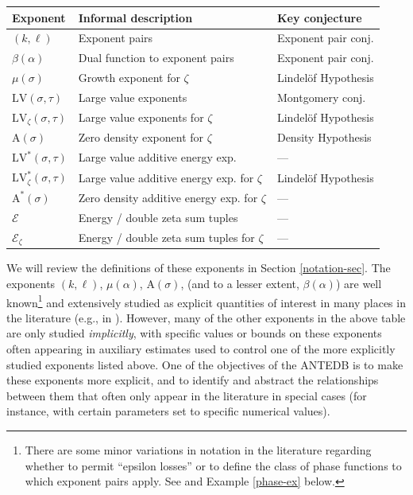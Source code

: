 \documentclass[a4paper, 10pt]{amsart}
\newcommand{\LV}{\mathrm{LV}}
\newcommand{\A}{\mathrm{A}}
\newcommand{\Energy}{\mathcal{E}}
\begin{document}
\begin{center}
    \begin{tabular}{lll}
        Exponent & Informal description & Key conjecture \\
        \hline
        $(k,\ell)$ & Exponent pairs & Exponent pair conj. \\
        $\beta(\alpha)$ & Dual function to exponent pairs & Exponent pair conj. \\
        $\mu(\sigma)$ & Growth exponent for $\zeta$ & Lindel\"{o}f Hypothesis \\
        $\LV(\sigma,\tau)$ & Large value exponents & Montgomery conj. \\
        $\LV_\zeta(\sigma,\tau)$ & Large value exponents for $\zeta$ & Lindel\"{o}f Hypothesis \\
        $\A(\sigma)$ & Zero density exponent for $\zeta$ & Density Hypothesis \\
        $\LV^*(\sigma,\tau)$ & Large value additive energy exp. & --- \\
        $\LV^*_\zeta(\sigma,\tau)$ & Large value additive energy exp. for $\zeta$ & Lindel\"{o}f Hypothesis \\
        $\A^*(\sigma)$ & Zero density additive energy exp. for $\zeta$ & --- \\
        $\Energy$ & Energy / double zeta sum tuples & --- \\
        $\Energy_\zeta$ & Energy / double zeta sum tuples for $\zeta$ & --- \\
        \hline
    \end{tabular}
\end{center}


We will review the definitions of these exponents in Section \ref{notation-sec}.  The exponents $(k,\ell)$, $\mu(\alpha)$, $\A(\sigma)$, (and to a lesser extent, $\beta(\alpha)$) are well known\footnote{There are some minor variations in notation in the literature regarding whether to permit ``epsilon losses'' or to define the class of phase functions to which exponent pairs apply.  See  and Example \ref{phase-ex} below.} and extensively studied as explicit quantities of interest in many places in the literature (e.g., in \cite{ivic}).  However, many of the other exponents in the above table are only studied \emph{implicitly}, with specific values or bounds on these exponents often appearing in auxiliary estimates  used to control one of the more explicitly studied exponents listed above.  One of the objectives of the ANTEDB is to make these exponents more explicit, and to identify and abstract the relationships between them that often only appear in the literature in special cases (for instance, with certain parameters set to specific numerical values).
\end{document}
